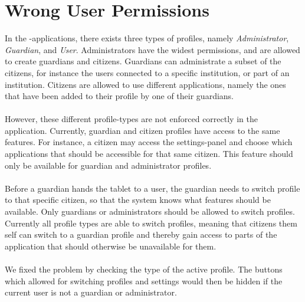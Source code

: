 \section{Wrong User Permissions}
\label{sec:wrong_user_permissions}

In the \giraf-applications, there exists three types of profiles, namely \emph{Administrator}, \emph{Guardian}, and \emph{User}. Administrators have the widest permissions, and are allowed to create guardians and citizens. Guardians can administrate a subset of the citizens, for instance the users connected to a specific institution, or part of an institution. Citizens are allowed to use different applications, namely the ones that have been added to their profile by one of their guardians. 
\\\\
However, these different profile-types are not enforced correctly in the \launcher application. Currently, guardian and citizen profiles have access to the same features. For instance, a citizen may access the settings-panel and choose which applications that should be accessible for that same citizen. This feature should only be available for guardian and administrator profiles.
\\\\
Before a guardian hands the tablet to a user, the guardian needs to switch profile to that specific citizen, so that the system knows what features should be available. Only guardians or administrators should be allowed to switch profiles. Currently all profile types are able to switch profiles, meaning that citizens them self can switch to a guardian profile and thereby gain access to parts of the application that should otherwise be unavailable for them.
\\\\
We fixed the problem by checking the type of the active profile. The buttons which allowed for switching profiles and settings would then be hidden if the current user is not a guardian or administrator.